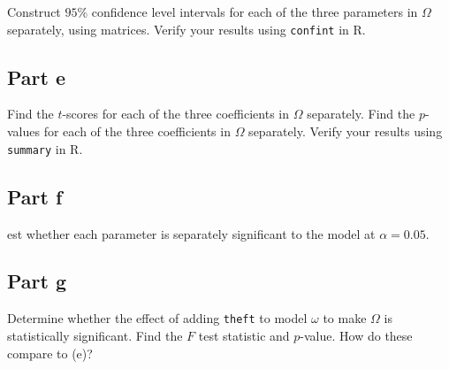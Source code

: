 \begin{question}
    Construct $95\%$ confidence level intervals for each of the three parameters in $\Omega$ separately, using matrices. Verify your results using \verb+confint+ in R.
\end{question}

\begin{answer}
    
\end{answer}

\subsection{Part e}

\begin{question}
    Find the $t$-scores for each of the three coefficients in $\Omega$ separately. Find the $p$-values for each of the three coefficients in $\Omega$ separately. Verify your results using \verb+summary+ in R.
\end{question}

\begin{answer}
    
\end{answer}

\subsection{Part f}

\begin{question}
    est whether each parameter is separately significant to the model at $\alpha = 0.05$.
\end{question}

\begin{answer}
    
\end{answer}

\subsection{Part g}

\begin{question}
    Determine whether the effect of adding \verb+theft+ to model $\omega$ to make $\Omega$ is statistically significant. Find the $F$ test statistic and $p$-value. How do these compare to (e)?
\end{question}

\begin{answer}
    
\end{answer}

